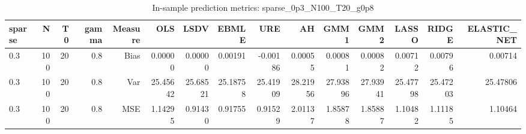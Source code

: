 \begin{table}[!htbp]\centering
\caption{In-sample prediction metrics: sparse_0p3_N100_T20_g0p8}
\label{tab:table2_sparse_0p3_N100_T20_g0p8}
\begin{tabular}{lrrrrrrrrrrrrrr}
\hline
sparse & N & T0 & gamma & Measure & OLS & LSDV & EBMLE & URE & AH & GMM1 & GMM2 & LASSO & RIDGE & ELASTIC_NET \\
\hline
0.3 & 100 & 20 & 0.8 & Bias & 0.00000 & 0.00000 & 0.00191 & -0.00186 & 0.00055 & 0.00081 & 0.00082 & 0.00712 & 0.00796 & 0.00714 \\
0.3 & 100 & 20 & 0.8 & Var & 25.45642 & 25.68521 & 25.18758 & 25.41909 & 28.21956 & 27.93896 & 27.93941 & 25.47798 & 25.47203 & 25.47806 \\
0.3 & 100 & 20 & 0.8 & MSE & 1.14295 & 0.91430 & 0.91755 & 0.91529 & 2.01137 & 1.85878 & 1.85887 & 1.10482 & 1.11185 & 1.10464 \\
\hline
\end{tabular}
\end{table}

